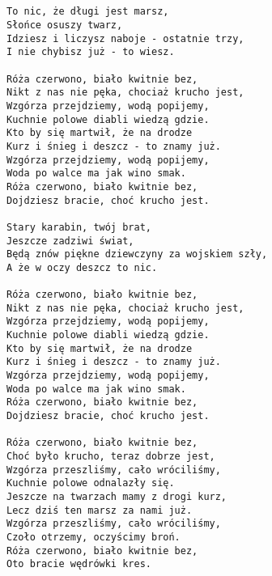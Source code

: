 \documentclass[12pt]{article}
\begin{document}
\subsection*{}
\begin{verbatim}
To nic, że długi jest marsz,
Słońce osuszy twarz,
Idziesz i liczysz naboje - ostatnie trzy,
I nie chybisz już - to wiesz.

Róża czerwono, biało kwitnie bez,
Nikt z nas nie pęka, chociaż krucho jest,
Wzgórza przejdziemy, wodą popijemy,
Kuchnie polowe diabli wiedzą gdzie.
Kto by się martwił, że na drodze
Kurz i śnieg i deszcz - to znamy już.
Wzgórza przejdziemy, wodą popijemy,
Woda po walce ma jak wino smak.
Róża czerwono, biało kwitnie bez,
Dojdziesz bracie, choć krucho jest.

Stary karabin, twój brat,
Jeszcze zadziwi świat,
Będą znów piękne dziewczyny za wojskiem szły,
A że w oczy deszcz to nic.

Róża czerwono, biało kwitnie bez,
Nikt z nas nie pęka, chociaż krucho jest,
Wzgórza przejdziemy, wodą popijemy,
Kuchnie polowe diabli wiedzą gdzie.
Kto by się martwił, że na drodze
Kurz i śnieg i deszcz - to znamy już.
Wzgórza przejdziemy, wodą popijemy,
Woda po walce ma jak wino smak.
Róża czerwono, biało kwitnie bez,
Dojdziesz bracie, choć krucho jest.

Róża czerwono, biało kwitnie bez,
Choć było krucho, teraz dobrze jest,
Wzgórza przeszliśmy, cało wróciliśmy,
Kuchnie polowe odnalazły się.
Jeszcze na twarzach mamy z drogi kurz,
Lecz dziś ten marsz za nami już.
Wzgórza przeszliśmy, cało wróciliśmy,
Czoło otrzemy, oczyścimy broń.
Róża czerwono, biało kwitnie bez,
Oto bracie wędrówki kres.
\end{verbatim}
\clearpage
\end{document}

